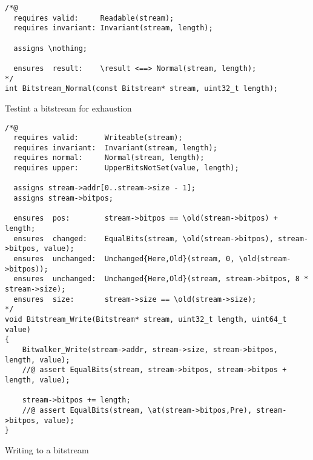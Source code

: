 \begin{listing}[hbt]
\begin{minipage}{0.99\textwidth}
\begin{lstlisting}[style=acsl-block]
/*@
  requires valid:     Readable(stream);
  requires invariant: Invariant(stream, length);

  assigns \nothing;

  ensures  result:    \result <==> Normal(stream, length);
*/
int Bitstream_Normal(const Bitstream* stream, uint32_t length);
\end{lstlisting}
\end{minipage}
\caption{\label{lst:Bitstream_Normal}Testint a bitstream for exhaustion}
\end{listing}




\begin{listing}[hbt]
\begin{minipage}{0.99\textwidth}
\begin{lstlisting}[style=acsl-block]
/*@
  requires valid:      Writeable(stream);
  requires invariant:  Invariant(stream, length);
  requires normal:     Normal(stream, length);
  requires upper:      UpperBitsNotSet(value, length);

  assigns stream->addr[0..stream->size - 1];
  assigns stream->bitpos;

  ensures  pos:        stream->bitpos == \old(stream->bitpos) + length;
  ensures  changed:    EqualBits(stream, \old(stream->bitpos), stream->bitpos, value);
  ensures  unchanged:  Unchanged{Here,Old}(stream, 0, \old(stream->bitpos));
  ensures  unchanged:  Unchanged{Here,Old}(stream, stream->bitpos, 8 * stream->size);
  ensures  size:       stream->size == \old(stream->size);
*/
void Bitstream_Write(Bitstream* stream, uint32_t length, uint64_t value)
{
    Bitwalker_Write(stream->addr, stream->size, stream->bitpos, length, value);
    //@ assert EqualBits(stream, stream->bitpos, stream->bitpos + length, value);

    stream->bitpos += length;
    //@ assert EqualBits(stream, \at(stream->bitpos,Pre), stream->bitpos, value);
}

\end{lstlisting}
\end{minipage}
\caption{Writing to a bitstream}
\end{listing}







